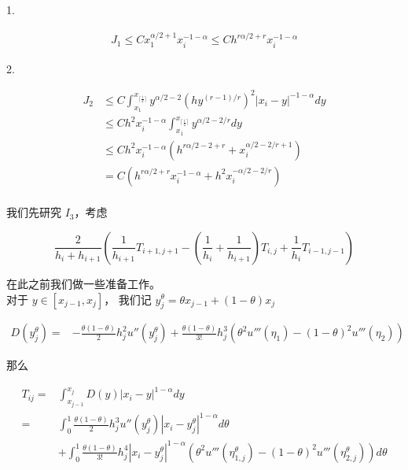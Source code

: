 \documentclass{ctexart}
\begin{document}
1. 

\begin{equation}
    \begin{aligned}
        J_1 \le C x_1^{\alpha/2+1} x_i^{-1-\alpha} \le C h^{r\alpha/2 +r} x_i^{-1-\alpha}
    \end{aligned}
\end{equation}


2.

\begin{equation}
    \begin{aligned}
        J_2 &\le C \int_{x_1}^{x_{\lceil \frac{i}{2}\rceil}} y^{\alpha/2-2} (h y^{(r-1)/r})^2 |x_i - y|^{-1-\alpha} dy      \\
        &\le C h^2 x_i^{-1-\alpha} \int_{x_1}^{x_{\lceil \frac{i}{2}\rceil}} y^{\alpha/2-2/r} dy    \\
        &\le C h^2 x_i^{-1-\alpha} (h^{r\alpha/2-2+r} + x_i^{\alpha/2-2/r+1})       \\
        &= C (h^{r\alpha/2+r} x_i^{-1-\alpha} + h^2x_i^{-\alpha/2-2/r})
    \end{aligned}
\end{equation}
\\

我们先研究 \(I_3\)，考虑

\begin{equation}
    \frac{2}{h_i + h_{i+1}} 
    \left( \frac{1}{h_{i+1}} T_{i+1, j+1} 
    - (\frac{1}{h_{i}}+\frac{1}{h_{i+1}}) T_{i,j}
    +  \frac{1}{h_{i}} T_{i-1, j-1} \right)
\end{equation}

在此之前我们做一些准备工作。    \\
对于 \(y\in [x_{j-1}, x_j]\)， 我们记 \(y_j^\theta = \theta x_{j-1} + (1-\theta) x_j\)

\begin{equation}
    \begin{aligned}
        D(y_j^\theta) =& -\frac{\theta (1-\theta)}{2} h_j^2 u''(y_j^\theta)
        + \frac{\theta (1-\theta)}{3!} h_j^3 (\theta^2 u'''(\eta_1) - (1-\theta)^2 u'''(\eta_2))
    \end{aligned}
\end{equation}

那么



\begin{equation}
    \begin{aligned}
        T_{ij} =& \int_{x_{j-1}}^{x_{j}} D(y) |x_i - y|^{1-\alpha} dy   \\
        =& \int_0^1 \frac{\theta (1-\theta)}{2} h_j^{3} u''(y_j^\theta) |x_i - y_j^\theta|^{1-\alpha} d\theta \\
        & + \int_0^1 \frac{\theta (1-\theta)}{3!} h_j^{4}  |x_i - y_j^\theta|^{1-\alpha} (\theta^2 u'''(\eta_{1,j}^\theta) -  (1-\theta)^2 u'''(\eta_{2,j}^\theta)) d\theta
    \end{aligned}
\end{equation}
\end{document}
